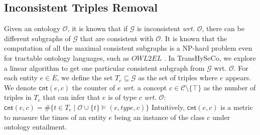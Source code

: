 \documentclass[sigconf]{acmart}
\newcommand{\TransHI}{TransHySeCo\xspace}
\newcommand{\counter}{\textsf{cnt}\xspace}
\begin{document}


 
\subsection{Inconsistent Triples Removal}
Given an ontology $\mathcal{O}$, it is known that if  $\mathcal{G}$ is inconsistent \textit{wrt.}  $\mathcal{O}$, there can be different subgraphs of $\mathcal{G}$ that are consistent with $\mathcal{O}$. It is known that the computation of all the maximal consistent subgraphs is a NP-hard problem even for tractable ontology languages, such as $OWL2EL$ \cite{PenaPhD}. In \TransHI, we explore a linear algorithm to get one particular consistent subgraph from $\mathcal{G}$ wrt. $\mathcal{O}$. 
For each entity $e \in E$, we define the set $T_e \subseteq \mathcal{G}$ as the set of triples where $e$ appears. 
We denote $\counter(e,c)$ the counter of $e$ \textit{wrt.} a concept $c\in \mathcal{C}\setminus\{\top\}$ as the number of triples in $T_e$
that can infer that $e$ is of type $c$ \textit{wrt.}  $\mathcal{O}$:
$ \counter(e,c)=
  \#\{t \in T_e \mid \mathcal{O} \cup \{t\} \models (e,type,c)\}$
Intuitively, $\counter(e,c)$ is a metric to measure the times of an entity $e$ being an instance of the class $c$ under ontology entailment.
\end{document}
